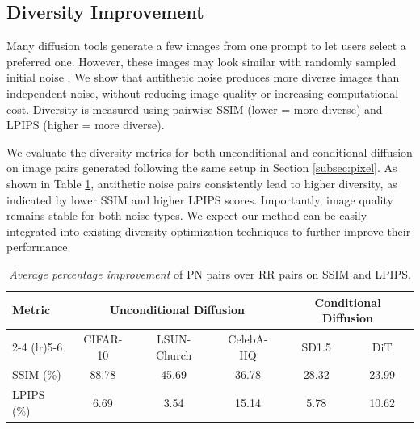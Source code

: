 \documentclass[12pt]{article}
\newcommand{\0}{\mathbf{0}}
\begin{document}
\subsection{Diversity Improvement}\label{subsec:diversity}
Many diffusion tools generate a few images from one prompt to let users select a preferred one. However, these images may look similar with randomly sampled initial noise \citep{marwood2023diversity,sadat2024cads}. We show that antithetic noise produces more diverse images than independent noise, without reducing image quality or increasing computational cost. Diversity is measured using pairwise SSIM (lower = more diverse) and LPIPS \citep{zhang2018unreasonable} (higher = more diverse).

We evaluate the diversity metrics for both unconditional and conditional diffusion on image pairs generated following the same setup in Section \ref{subsec:pixel}. As shown in Table \ref{tab:diversity_relative_percentage}, antithetic noise pairs consistently lead to higher diversity, as indicated by lower SSIM and higher LPIPS scores. Importantly, image quality remains stable for both noise types. We expect our method can be easily integrated into existing diversity optimization techniques to further improve their performance.




\begin{table}[hbtp]
\centering
\caption{\textit{Average percentage improvement} of PN pairs over RR pairs on SSIM and LPIPS.}
\label{tab:diversity_relative_percentage}
\begin{tabular}{lccccc}
\toprule
\textbf{Metric} & 
\multicolumn{3}{c}{\textbf{Unconditional Diffusion}} & 
\multicolumn{2}{c}{\textbf{Conditional Diffusion}} \\
\cmidrule(lr){2-4} \cmidrule(lr){5-6}
 & CIFAR-10 & LSUN-Church & CelebA-HQ & SD1.5 & DiT \\
\midrule
SSIM (\%)   & 88.78  &  45.69 & 36.78  & 28.32  & 23.99 \\
LPIPS (\%)  & 6.69 &  3.54 &  15.14 &  5.78 &  10.62 \\
\bottomrule
\end{tabular}
\end{table}
\end{document}
